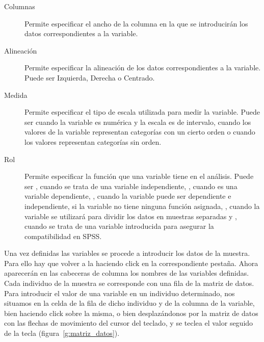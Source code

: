 \begin{description}
\item[Columnas] Permite especificar el ancho de la columna en la que se introducirán los datos correspondientes a la variable. 

\item[Alineación] Permite especificar la alineación de los datos correspondientes a la variable. Puede ser Izquierda, Derecha o Centrado. 

\item[Medida] Permite especificar el tipo de escala utilizada para medir la variable. Puede ser  cuando la variable es numérica y la escala es de intervalo,  cuando los valores de la variable representan categorías con un cierto orden o  cuando los valores representan categorías sin orden.
\item[Rol] Permite especificar la función que una variable tiene en el análisis. Puede ser , cuando se trata de una variable
independiente, , cuando es una variable dependiente, , cuando la variable puede ser dependiente e
independiente,  si la variable no tiene ninguna función asignada, , cuando la variable se utilizará para
dividir los datos en muestras separadas y , cuando se trata de una variable introducida para asegurar la compatibilidad en
SPSS.
\end{description}


Una vez definidas las variables se procede a introducir los datos de la muestra. Para ello hay que volver a la  haciendo click en la correspondiente pestaña. Ahora aparecerán en las cabeceras de columna los nombres de las variables definidas. Cada individuo de la muestra se corresponde con una fila de la matriz de datos. Para introducir el valor de una variable en un individuo determinado, nos situamos en la celda de la fila de dicho individuo y de la columna de la variable, bien haciendo click sobre la misma, o bien desplazándonos por la matriz de datos con las flechas de movimiento del cursor del teclado, y se teclea el valor seguido de la tecla  (figura~\ref{g:matriz_datos}).

